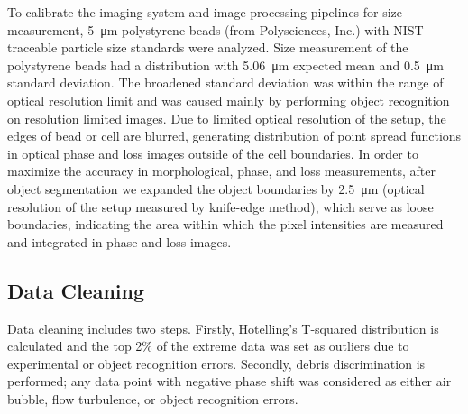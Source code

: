 \documentclass[aps,pra,reprint,longbibliography,superscriptaddress]{revtex4-1}
\begin{document}
To calibrate the imaging system and image processing pipelines for size measurement, \SI{5}{\micro\meter} polystyrene beads (from Polysciences, Inc.) with NIST traceable particle size standards were analyzed. Size measurement of the polystyrene beads had a distribution with \SI{5.06}{\micro\meter} expected mean and \SI{0.5}{\micro\meter} standard deviation. The broadened standard deviation was within the range of optical resolution limit and was caused mainly by performing object recognition on resolution limited images. Due to limited optical resolution of the setup, the edges of bead or cell are blurred, generating distribution of point spread functions in optical phase and loss images outside of the cell boundaries. In order to maximize the accuracy in morphological, phase, and loss measurements, after object segmentation we expanded the object boundaries by \SI{2.5}{\micro\meter} (optical resolution of the setup measured by knife-edge method), which serve as loose boundaries, indicating the area within which the pixel intensities are measured and integrated in phase and loss images.

\subsection{Data Cleaning}

Data cleaning includes two steps. Firstly, Hotelling's T-squared distribution is calculated and the top 2\% of the extreme data was set as outliers due to experimental or object recognition errors. Secondly, debris discrimination is performed; any data point with negative phase shift was considered as either air bubble, flow turbulence, or object recognition errors.


\end{document}
